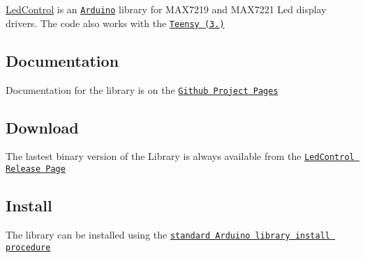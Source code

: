 \hyperlink{class_led_control}{Led\+Control} is an \href{http://arduino.cc}{\tt Arduino} library for M\+A\+X7219 and M\+A\+X7221 Led display drivers. The code also works with the \href{https://www.pjrc.com/teensy/}{\tt Teensy (3.)}

\subsection*{Documentation }

Documentation for the library is on the \href{http://wayoda.github.io/LedControl/}{\tt Github Project Pages}

\subsection*{Download }

The lastest binary version of the Library is always available from the \href{https://github.com/wayoda/LedControl/releases}{\tt Led\+Control Release Page}

\subsection*{Install }

The library can be installed using the \href{http://arduino.cc/en/Guide/Libraries}{\tt standard Arduino library install procedure} 